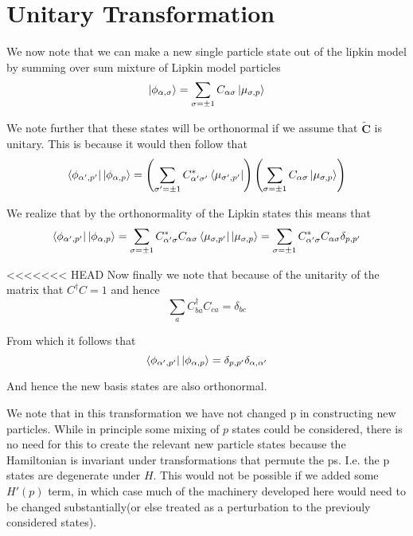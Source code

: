\documentclass[11pt]{article} %
\begin{document}
\section{Unitary Transformation}

We now note that we can make a new single particle state out of the lipkin model by summing over sum mixture of Lipkin model particles\\

\begin{equation} \ket{\phi_{\alpha,\sigma}}=\sum_{\sigma=\pm 1} C_{\alpha \sigma} \ket{\mu_{\sigma,p}}\end{equation}

We note further that these states will be orthonormal if we assume that $\mathbf{\tilde{C}}$ is unitary. This is because it would then follow that\\

\begin{equation}
\bra{\phi_{\alpha',p'}}\ket{\phi_{\alpha,p}}=\left(\sum_{\sigma'=\pm 1} C_{\alpha' \sigma'}^*\bra{\mu_{\sigma',p'}}\right)\left(\sum_{\sigma=\pm 1} C_{\alpha \sigma}\ket{\mu_{\sigma,p}}\right)\end{equation}

We realize that by the orthonormality of the Lipkin states this means that\\
\begin{equation}
\bra{\phi_{\alpha',p'}}\ket{\phi_{\alpha,p}}= \sum_{\sigma=\pm 1} C_{\alpha' \sigma}^* C_{\alpha \sigma} \bra{\mu_{\sigma,p'}} \ket{\mu_{\sigma,p}}=\sum_{\sigma=\pm 1} C_{\alpha' \sigma}^* C_{\alpha \sigma} \delta_{p,p'}\end{equation}

<<<<<<< HEAD
Now finally we note that because of the unitarity of the matrix that $C^\dagger C=1$ and hence \\
\begin{equation} \sum_a C_{ b a}^\dagger C_{c a}=\delta_{bc} \end{equation}

From which it follows that
\begin{equation}
\bra{\phi_{\alpha',p'}}\ket{\phi_{\alpha,p}}=\delta_{p,p'}\delta_{\alpha,\alpha'}\end{equation}

And hence the new basis states are also orthonormal. 

We note that in this transformation we have not changed p in constructing new particles. While in principle some mixing of $p$ states could be considered, there is no need for this to create the relevant new particle states because the Hamiltonian is invariant under transformations that permute the ps. I.e. the p states are degenerate under $H$. This would not be possible if we added some $H'(p)$ term, in which case much of the machinery developed here would need to be changed substantially(or else treated as a perturbation to the previouly considered states).\\
\end{document}
